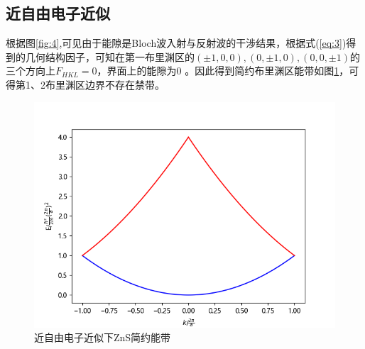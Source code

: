 \documentclass{article}
\begin{document}
\subsection{近自由电子近似}
根据图\ref{fig:4},可见由于能隙是Bloch波入射与反射波的干涉结果，根据式(\ref{eq:3})得到的几何结构因子，可知在第一布里渊区的$ (\pm1,0,0),(0,\pm1,0),(0,0,\pm1) $的三个方向上$ F_{HKL} =0$，界面上的能隙为0 。因此得到简约布里渊区能带如图\ref{fig:7}，可得第1、2布里渊区边界不存在禁带。
	\begin{figure}[!h]
	\centering
	\includegraphics[scale=1]{freeband}
	\caption{\heiti{}近自由电子近似下ZnS简约能带}
	\label{fig:7}%
\end{figure}
\end{document}

